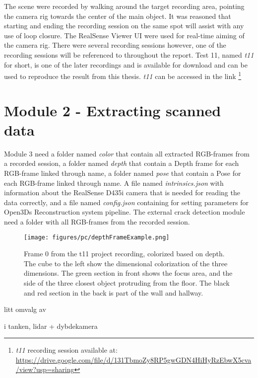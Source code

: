 The scene were recorded by walking around the target recording area, pointing the camera rig towards the center of the main object. It was reasoned that starting and ending the recording session on the same spot will assist with any use of loop closure. The RealSense Viewer UI were used for real-time aiming of the camera rig. There were several recording sessions however, one of the recording sessions will be referenced to throughout the report. Test 11, named \textit{t11} for short, is one of the later recordings and is available for download and can be used to reproduce the result from this thesis. \textit{t11} can be accessed in the link \footnote{\textit{t11} recording session available at: \url{https://drive.google.com/file/d/131TbmoZy8RP5gwGDN4HiHyRzEbwX5cva/view?usp=sharing}}



\section{Module 2 - Extracting scanned data}
Module 3 need a folder named \textit{color} that contain all extracted RGB-frames from a recorded session, a folder named \textit{depth} that contain a Depth frame for each RGB-frame linked through name, a folder named \textit{pose} that contain a Pose for each RGB-frame linked through name. A file named \textit{intrinsics.json} with information about the RealSense D435i camera that is needed for reading the data correctly, and a file named \textit{config.json} containing for setting parameters for Open3Ds Reconstruction system pipeline. The external crack detection module need a folder with all RGB-frames from the recorded session.


\begin{wrapfigure}{r}{0.45\textwidth}
    \texttt{[image: figures/pc/depthFrameExample.png]}
    \caption{Frame 0 from the t11 project recording, colorized based on depth. The cube to the left show the dimensional colorization of the three dimensions. The green section in front shows the focus area, and the side of the three closest object protruding from the floor. The black and red section in the back is part of the wall and hallway.}
    \centering
    \label{fig:depthFrame}
\end{wrapfigure}

litt omvalg av 


i tanken, lidar + dybdekamera




